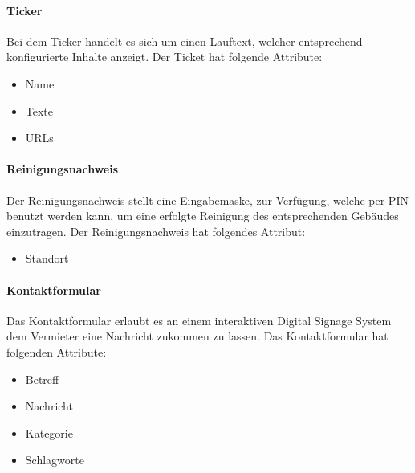 \documentclass[a4paper]{article}
\begin{document}
	\paragraph{Ticker}
	Bei dem Ticker handelt es sich um einen Lauftext, welcher entsprechend konfigurierte Inhalte anzeigt.
	Der Ticket hat folgende Attribute:
	\begin{itemize}
	\item Name
	\item Texte
	\item URLs
	\end{itemize}
	\paragraph{Reinigungsnachweis}
	Der Reinigungsnachweis stellt eine Eingabemaske, zur Verfügung, welche per PIN benutzt werden kann, um eine erfolgte Reinigung des entsprechenden Gebäudes einzutragen.
	Der Reinigungsnachweis hat folgendes Attribut:
	\begin{itemize}
	\item Standort
	\end{itemize}
	\paragraph{Kontaktformular}
	Das Kontaktformular erlaubt es an einem interaktiven Digital Signage System dem Vermieter eine Nachricht zukommen zu lassen.
	Das Kontaktformular hat folgenden Attribute:
	\begin{itemize}
	\item Betreff
	\item Nachricht
	\item Kategorie
	\item Schlagworte
	\end{itemize}
\end{document}
